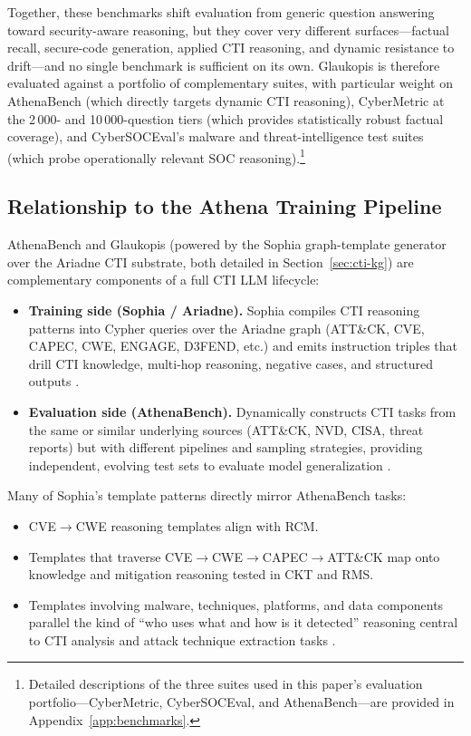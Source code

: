 \documentclass[conference]{IEEEtran}
\begin{document}
Together, these benchmarks shift evaluation from generic question answering toward security-aware reasoning, but they cover very different surfaces---factual recall, secure-code generation, applied CTI reasoning, and dynamic resistance to drift---and no single benchmark is sufficient on its own. Glaukopis is therefore evaluated against a portfolio of complementary suites, with particular weight on AthenaBench (which directly targets dynamic CTI reasoning), CyberMetric at the 2\,000- and 10\,000-question tiers (which provides statistically robust factual coverage), and CyberSOCEval's malware and threat-intelligence test suites (which probe operationally relevant SOC reasoning).\footnote{Detailed descriptions of the three suites used in this paper's evaluation portfolio---CyberMetric, CyberSOCEval, and AthenaBench---are provided in Appendix~\ref{app:benchmarks}.}

\subsection{Relationship to the Athena Training Pipeline}

AthenaBench and Glaukopis (powered by the Sophia graph-template generator over the Ariadne CTI substrate, both detailed in Section~\ref{sec:cti-kg}) are complementary components of a full CTI LLM lifecycle:

\begin{itemize}
  \item \textbf{Training side (Sophia / Ariadne).} Sophia compiles CTI reasoning patterns into Cypher queries over the Ariadne graph (ATT\&CK, CVE, CAPEC, CWE, ENGAGE, D3FEND, etc.) and emits instruction triples that drill CTI knowledge, multi-hop reasoning, negative cases, and structured outputs \cite{cardei2025ift}.
  \item \textbf{Evaluation side (AthenaBench).} Dynamically constructs CTI tasks from the same or similar underlying sources (ATT\&CK, NVD, CISA, threat reports) but with different pipelines and sampling strategies, providing independent, evolving test sets to evaluate model generalization \cite{alam2025athenabench}.
\end{itemize}

Many of Sophia's template patterns directly mirror AthenaBench tasks:
\begin{itemize}
  \item CVE$\rightarrow$CWE reasoning templates align with RCM.
  \item Templates that traverse CVE$\rightarrow$CWE$\rightarrow$CAPEC$\rightarrow$ATT\&CK map onto knowledge and mitigation reasoning tested in CKT and RMS.
  \item Templates involving malware, techniques, platforms, and data components parallel the kind of ``who uses what and how is it detected'' reasoning central to CTI analysis and attack technique extraction tasks \cite{cardei2025ift}.
\end{itemize}
\end{document}
